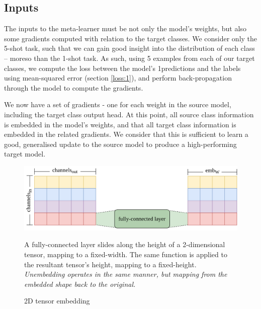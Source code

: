\documentclass{report}
\begin{document}
\subsection{Inputs}
The inputs to the meta-learner must be not only the model's weights, but also some gradients computed with relation to the target classes. We consider only the 5-shot task, such that we can gain good insight into the distribution of each class -- moreso than the 1-shot task. As such, using 5 examples from each of our target classes, we compute the loss between the model's 1predictions and the labels using mean-squared error (section \ref{loss:1}), and perform back-propagation through the model to compute the gradients. \par
We now have a set of gradients - one for each weight in the source model, including the target class output head. At this point, all source class information is embedded in the model's weights, and that all target class information is embedded in the related gradients. We consider that this is sufficient to learn a good, generalised update to the source model to produce a high-performing target model.

\begin{figure}[h!]
	\centering
	\includegraphics[width=12cm]{embedding}
	\caption{2D tensor embedding}
	\label{fig:embedding:1}
	A fully-connected layer slides along the height of a 2-dimensional tensor, mapping to a fixed-width. The same function is applied to the resultant tensor's height, mapping to a fixed-height. \textit{Unembedding operates in the same manner, but mapping from the embedded shape back to the original.}
\end{figure}
\end{document}
